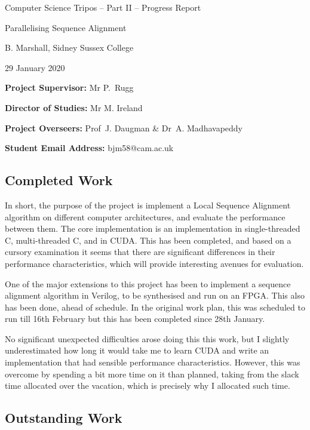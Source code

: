\documentclass[a4paper,12pt]{article}
\begin{document}

\vfil

\centerline{\Large Computer Science Tripos -- Part II -- Progress Report}
\vspace{0.4in}
\centerline{\Huge Parallelising Sequence Alignment}
\vspace{0.4in}
\centerline{\large B. Marshall, Sidney Sussex College}
\vspace{0.1in}
\centerline{\large 29 January 2020}
\vspace{0.25in}

\noindent
{\bf Project Supervisor:} Mr P.~Rugg

\noindent
{\bf Director of Studies:} Mr M. Ireland

\noindent
{\bf Project Overseers:} Prof~J. Daugman  \& Dr~A. Madhavapeddy

\noindent
{\bf Student Email Address:} bjm58@cam.ac.uk


\subsection*{Completed Work}

In short, the purpose of the project is implement a Local Sequence Alignment algorithm on different computer architectures, and evaluate the performance between them.
The core implementation is an implementation in single-threaded C, multi-threaded C, and in CUDA.
This has been completed, and based on a cursory examination it seems that there are significant differences in their performance characteristics, which will provide interesting avenues for evaluation.

One of the major extensions to this project has been to implement a sequence alignment algorithm in Verilog, to be synthesised and run on an FPGA.
This also has been done, ahead of schedule.
In the original work plan, this was scheduled to run till 16th February but this has been completed since 28th January.

No significant unexpected difficulties arose doing this this work, but I slightly underestimated how long it would take me to learn CUDA and write an implementation that had sensible performance characteristics.
However, this was overcome by spending a bit more time on it than planned, taking from the slack time allocated over the vacation, which is precisely why I allocated such time.

\subsection*{Outstanding Work}
\end{document}

